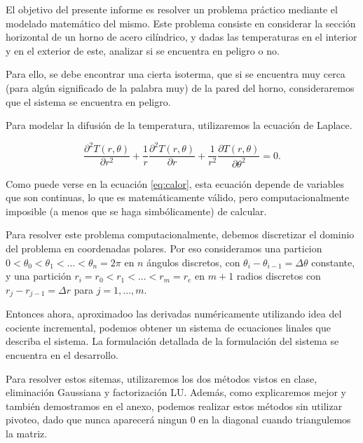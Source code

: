 
El objetivo del presente informe es resolver un problema práctico mediante el modelado matemático del mismo. Este problema consiste en considerar la sección horizontal de un horno de acero cilíndrico, y dadas las temperaturas en el interior y en el exterior de este, analizar si se encuentra en peligro o no.

Para ello, se debe encontrar una cierta isoterma, que si se encuentra muy cerca (para algún significado de la palabra muy) de la pared del horno, consideraremos que el sistema se encuentra en peligro.

Para modelar la difusión de la temperatura, utilizaremos la ecuación de Laplace.

\begin{equation}\label{eq:calor}
\frac{\partial^2T(r,\theta)}{\partial r^{2}}+\frac1r \frac{\partial^2 T(r,\theta)}{\partial r} + \frac{1}{r^2} \frac{\partial T(r, \theta)}{\partial \theta^2} = 0.
\end{equation}

Como puede verse en la ecuación \ref{eq:calor}, esta ecuación depende de variables que son continuas, lo que es matemáticamente válido, pero computacionalmente imposible (a menos que se haga simbólicamente) de calcular.

Para resolver este problema computacionalmente, debemos discretizar el dominio del problema en coordenadas polares. Por eso consideramos una particion $0 < \theta_0 < \theta_1 < ... < \theta_n = 2\pi$ en $n$ ángulos discretos, con $\theta_i - \theta_{i-1} = \Delta\theta$ constante, y una partición $r_i = r_0 < r_1 < ... < r_m = r_e$ en $m+1$ radios discretos con $r_j - r_{j-1} = \Delta r$ para $j = 1,...,m$.

Entonces ahora, aproximadoo las derivadas numéricamente utilizando idea del cociente incremental, podemos obtener un sistema de ecuaciones linales que describa el sistema. La formulación detallada de la formulación del sistema se encuentra en el desarrollo.

Para resolver estos sitemas, utilizaremos los dos métodos vistos en clase, eliminación Gaussiana y factorización LU. Además, como explicaremos mejor y también demostramos en el anexo, podemos realizar estos métodos sin utilizar pivoteo, dado que nunca aparecerá ningun $0$ en la diagonal cuando triangulemos la matriz.



